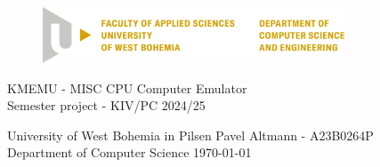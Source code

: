 \documentclass[12pt,a4paper]{paper}
\begin{document}
\begin{figure}[H]
	\centering
	\includegraphics[width=0.8\textwidth]{pic/kiv-cmyk-en}
\end{figure}

\begin{center}
	\vspace{.5cm}
	\LARGE{KMEMU - MISC CPU Computer Emulator}\\
	\large{Semester project - KIV/PC 2024/25}
\end{center}

\vfill

\noindent
University of West Bohemia in Pilsen \hfill Pavel Altmann - A23B0264P\\
Department of Computer Science \hfill \today
\thispagestyle{empty}

\newpage
\setcounter{page}{1}

\tableofcontents

\newpage
\end{document}
